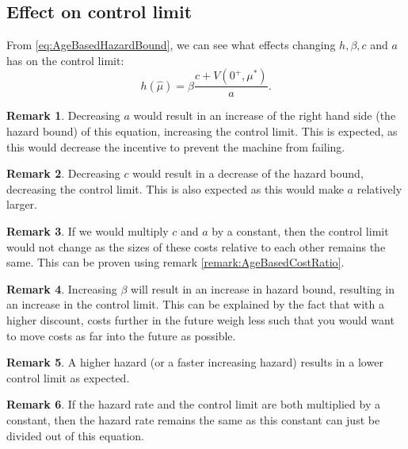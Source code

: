\documentclass[a4paper]{thesis}
\theoremstyle{definition}
\newtheorem{remark}{Remark}[chapter]
\begin{document}
\subsection{Effect on control limit}
From \eqref{eq:AgeBasedHazardBound}, we can see what effects changing $h,\beta,c$ and $a$ has on the control limit:
\[h(\hat{\mu})=\beta\frac{c+V(0^+,\mu^*)}{a}.\]
\begin{remark}
	Decreasing  $a$ would result in an increase of the right hand side (the hazard bound) of this equation, increasing the control limit.
	This is expected, as this would decrease the incentive to prevent the machine from failing.
\end{remark}
\begin{remark}
	Decreasing $c$ would result in a decrease of the hazard bound, decreasing the control limit.
	This is also expected as this would make $a$ relatively larger.
\end{remark}
\begin{remark}
	If we would multiply $c$ and $a$ by a constant, then the control limit would not change as the sizes of these costs relative to each other remains the same.
	This can be proven using remark \ref{remark:AgeBasedCostRatio}.
\end{remark}
\begin{remark}\label{remark:AgeBasedControlLimitDiscountIncrease}
	Increasing $\beta$ will result in an increase in hazard bound, resulting in an increase in the control limit.
	This can be explained by the fact that with a higher discount, costs further in the future weigh less such that you would want to move costs as far into the future as possible.
\end{remark}
\begin{remark}
	A higher hazard (or a faster increasing hazard) results in a lower control limit as expected.
\end{remark}
\begin{remark}\label{remark:AgeBasedControlLimitDiscountAndHazardIncrease}
	If the hazard rate and the control limit are both multiplied by a constant, then the hazard rate remains the same as this constant can just be divided out of this equation.
\end{remark}
\end{document}
